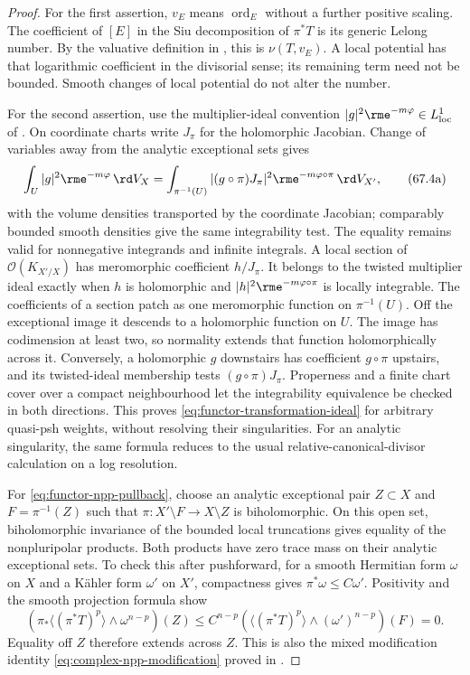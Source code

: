 \begin{proof}
For the first assertion, $v_E$ means $\operatorname{ord}_E$ without a
further positive scaling. The coefficient of $[E]$ in the Siu
decomposition of $\pi^*T$ is its generic Lelong number. By the valuative
definition in , this is $\nu(T,v_E)$.
A local potential has that logarithmic coefficient in the divisorial
sense; its remaining term need not be bounded. Smooth changes of local
potential do not alter the number.

For the second assertion, use the multiplier-ideal convention
$|g|^2\rme^{-m\varphi}\in L^1_{\mathrm{loc}}$ of
. On coordinate charts write $J_\pi$
for the holomorphic Jacobian. Change of variables away from the analytic
exceptional sets gives
\[
 \int_U |g|^2\rme^{-m\varphi}\,\rd V_X
 =\int_{\pi^{-1}(U)}
    |(g\circ\pi)J_\pi|^2\rme^{-m\varphi\circ\pi}\,\rd V_{X'},
\tag{67.4a}\label{eq:functor-jacobian-integrability}
\]
with the volume densities transported by the coordinate Jacobian;
comparably bounded smooth densities give the same integrability test.
The equality remains valid for nonnegative integrands and infinite
integrals. A local section of $\mathcal O(K_{X'/X})$ has meromorphic
coefficient $h/J_\pi$. It belongs to the twisted multiplier ideal exactly
when $h$ is holomorphic and $|h|^2\rme^{-m\varphi\circ\pi}$ is locally
integrable. The coefficients of a section patch as one meromorphic function on
$\pi^{-1}(U)$. Off the exceptional image it descends to a holomorphic
function on $U$. The image has codimension at least two, so normality
extends that function holomorphically across it. Conversely, a
holomorphic $g$ downstairs has coefficient $g\circ\pi$ upstairs, and
its twisted-ideal membership tests $(g\circ\pi)J_\pi$. Properness and a finite chart cover over a
compact neighbourhood let the integrability equivalence be checked in
both directions. This proves \eqref{eq:functor-transformation-ideal}
for arbitrary quasi-psh weights, without resolving their singularities.
For an analytic singularity, the same formula reduces to the usual
relative-canonical-divisor calculation on a log resolution.

For \eqref{eq:functor-npp-pullback}, choose an analytic exceptional pair
$Z\subset X$ and $F=\pi^{-1}(Z)$ such that
$\pi:X'\setminus F\to X\setminus Z$ is biholomorphic. On this open set,
biholomorphic invariance of the bounded local truncations gives equality
of the nonpluripolar products. Both products have zero trace mass on their
analytic exceptional sets. To check this after pushforward, for a smooth
Hermitian form $\omega$ on $X$ and a K\"ahler form $\omega'$ on $X'$,
compactness gives $\pi^*\omega\leq C\omega'$. Positivity and the smooth
projection formula show
\[
 \left(\pi_*\langle(\pi^*T)^p\rangle\wedge\omega^{n-p}\right)(Z)
 \leq C^{n-p}
 \left(\langle(\pi^*T)^p\rangle\wedge(\omega')^{n-p}\right)(F)=0.
\tag{67.4b}\label{eq:functor-npp-exceptional-trace}
\]
Equality off $Z$ therefore extends across $Z$. This is also the mixed
modification identity \eqref{eq:complex-npp-modification} proved in
.

\end{proof}

